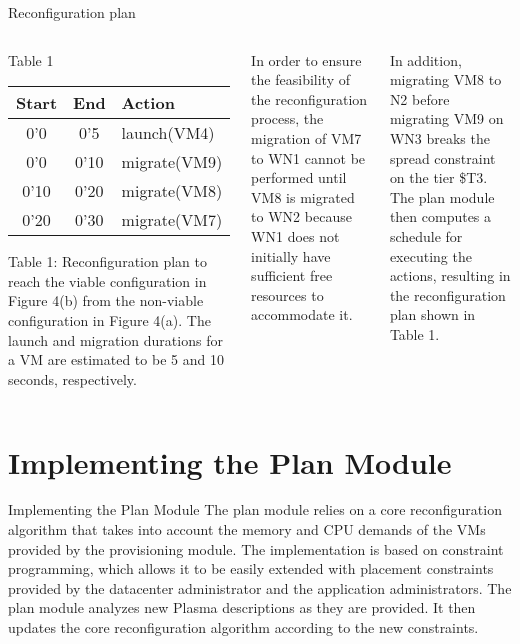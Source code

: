 \begin{frame}{Reconfiguration plan}

\begin{columns}[t]

\begin{block}{Table 1}
\begin{center}
\begin{tabular}{|c|c||l|}
\hline     
Start & End & Action \\
\hline     
 0'0  & 0'5  & launch(VM4) \\
 0’0  & 0'10 & migrate(VM9) \\
0'10  & 0'20 & migrate(VM8) \\
0'20  & 0'30 & migrate(VM7) \\
\hline     
\end{tabular}
\end{center}

Table 1: Reconfiguration plan to reach the viable configuration in Figure 4(b)
from the non-viable configuration in Figure 4(a). The launch and migration
durations for a VM are estimated to be 5 and 10 seconds, respectively.

\end{block}



{

\pause{}
In order to ensure the feasibility of
the reconfiguration process, the migration of VM7 to WN1 cannot be performed
until VM8 is migrated to WN2 because WN1 does not initially have sufficient free
resources to accommodate it. 

\br \pause{}
In addition, migrating VM8 to N2 before migrating
VM9 on WN3 breaks the spread constraint on the tier \$T3. The plan module then
computes a schedule for executing the actions, resulting in the reconfiguration
plan shown in Table 1.

}
\end{columns}
\end{frame}

\section{Implementing the Plan Module} 

\begin{frame}{Implementing the Plan Module} 
The plan module relies on a \alert{core reconfiguration algorithm} that takes 
into account the memory and CPU demands of the VMs provided by the provisioning
module. 
\br \pause
The implementation is based on \alert{constraint programming}, which
allows it to be easily extended with placement constraints provided by the datacenter
administrator and the application administrators. The plan module
analyzes new Plasma descriptions as they are provided. It then updates the
core reconfiguration algorithm according to the new constraints.

\end{frame}

